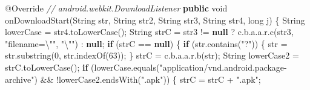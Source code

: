 \documentclass[
]{article}
\newenvironment{Shaded}{}{}
\newcommand{\AttributeTok}[1]{\textcolor[rgb]{0.49,0.56,0.16}{#1}}
\newcommand{\BuiltInTok}[1]{\textcolor[rgb]{0.00,0.50,0.00}{#1}}
\newcommand{\CommentTok}[1]{\textcolor[rgb]{0.38,0.63,0.69}{\textit{#1}}}
\newcommand{\ControlFlowTok}[1]{\textcolor[rgb]{0.00,0.44,0.13}{\textbf{#1}}}
\newcommand{\DataTypeTok}[1]{\textcolor[rgb]{0.56,0.13,0.00}{#1}}
\newcommand{\DecValTok}[1]{\textcolor[rgb]{0.25,0.63,0.44}{#1}}
\newcommand{\FunctionTok}[1]{\textcolor[rgb]{0.02,0.16,0.49}{#1}}
\newcommand{\KeywordTok}[1]{\textcolor[rgb]{0.00,0.44,0.13}{\textbf{#1}}}
\newcommand{\NormalTok}[1]{#1}
\newcommand{\OperatorTok}[1]{\textcolor[rgb]{0.40,0.40,0.40}{#1}}
\newcommand{\SpecialCharTok}[1]{\textcolor[rgb]{0.25,0.44,0.63}{#1}}
\newcommand{\StringTok}[1]{\textcolor[rgb]{0.25,0.44,0.63}{#1}}
\begin{document}
\begin{Shaded}
\begin{Highlighting}[]
        \AttributeTok{@Override} \CommentTok{// android.webkit.DownloadListener}
        \KeywordTok{public} \DataTypeTok{void} \FunctionTok{onDownloadStart}\OperatorTok{(}\BuiltInTok{String}\NormalTok{ str}\OperatorTok{,} \BuiltInTok{String}\NormalTok{ str2}\OperatorTok{,} \BuiltInTok{String}\NormalTok{ str3}\OperatorTok{,} \BuiltInTok{String}\NormalTok{ str4}\OperatorTok{,} \DataTypeTok{long}\NormalTok{ j}\OperatorTok{)} \OperatorTok{\{}
            \BuiltInTok{String}\NormalTok{ lowerCase }\OperatorTok{=}\NormalTok{ str4}\OperatorTok{.}\FunctionTok{toLowerCase}\OperatorTok{();}
            \BuiltInTok{String}\NormalTok{ strC }\OperatorTok{=}\NormalTok{ str3 }\OperatorTok{!=} \KeywordTok{null} \OperatorTok{?}\NormalTok{ c}\OperatorTok{.}\FunctionTok{b}\OperatorTok{.}\FunctionTok{a}\OperatorTok{.}\FunctionTok{a}\OperatorTok{.}\FunctionTok{r}\OperatorTok{.}\FunctionTok{c}\OperatorTok{(}\NormalTok{str3}\OperatorTok{,} \StringTok{"filename=}\SpecialCharTok{\textbackslash{}"}\StringTok{"}\OperatorTok{,} \StringTok{"}\SpecialCharTok{\textbackslash{}"}\StringTok{"}\OperatorTok{)} \OperatorTok{:} \KeywordTok{null}\OperatorTok{;}
            \ControlFlowTok{if} \OperatorTok{(}\NormalTok{strC }\OperatorTok{==} \KeywordTok{null}\OperatorTok{)} \OperatorTok{\{}
                \ControlFlowTok{if} \OperatorTok{(}\NormalTok{str}\OperatorTok{.}\FunctionTok{contains}\OperatorTok{(}\StringTok{"?"}\OperatorTok{))} \OperatorTok{\{}
\NormalTok{                    str }\OperatorTok{=}\NormalTok{ str}\OperatorTok{.}\FunctionTok{substring}\OperatorTok{(}\DecValTok{0}\OperatorTok{,}\NormalTok{ str}\OperatorTok{.}\FunctionTok{indexOf}\OperatorTok{(}\DecValTok{63}\OperatorTok{));}
                \OperatorTok{\}}
\NormalTok{                strC }\OperatorTok{=}\NormalTok{ c}\OperatorTok{.}\FunctionTok{b}\OperatorTok{.}\FunctionTok{a}\OperatorTok{.}\FunctionTok{a}\OperatorTok{.}\FunctionTok{r}\OperatorTok{.}\FunctionTok{b}\OperatorTok{(}\NormalTok{str}\OperatorTok{);}
                \BuiltInTok{String}\NormalTok{ lowerCase2 }\OperatorTok{=}\NormalTok{ strC}\OperatorTok{.}\FunctionTok{toLowerCase}\OperatorTok{();}
                \ControlFlowTok{if} \OperatorTok{(}\NormalTok{lowerCase}\OperatorTok{.}\FunctionTok{equals}\OperatorTok{(}\StringTok{"application/vnd.android.package{-}archive"}\OperatorTok{)} \OperatorTok{\&\&} \OperatorTok{!}\NormalTok{lowerCase2}\OperatorTok{.}\FunctionTok{endsWith}\OperatorTok{(}\StringTok{".apk"}\OperatorTok{))} \OperatorTok{\{}
\NormalTok{                    strC }\OperatorTok{=}\NormalTok{ strC }\OperatorTok{+} \StringTok{".apk"}\OperatorTok{;}

\end{Highlighting}
\end{Shaded}
\end{document}
